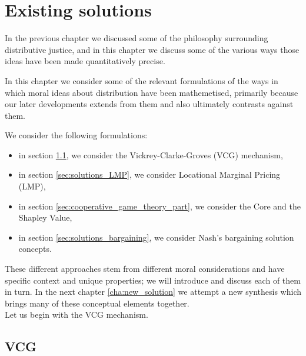 \chapter{Existing solutions}
\label{cha:solutions}

In the previous chapter we discussed some of the philosophy surrounding distributive justice, and in this chapter we discuss some of the various ways those ideas have been made quantitatively precise.

In this chapter we consider some of the relevant formulations of the ways in which moral ideas about distribution have been mathemetised, primarily because our later developments extends from them and also ultimately contrasts against them.

We consider the following formulations:
\begin{itemize}
\item in section \ref{sec:solutions_VCG}, we consider the Vickrey-Clarke-Groves (VCG) mechanism,
\item in section \ref{sec:solutions_LMP}, we consider Locational Marginal Pricing (LMP),
\item in section \ref{sec:cooperative_game_theory_part}, we consider the Core and the Shapley Value,
\item in section \ref{sec:solutions_bargaining}, we consider Nash's bargaining solution concepts.
\end{itemize}


These different approaches stem from different moral considerations and have specific context and unique properties; we will introduce and discuss each of them in turn.
In the next chapter \ref{cha:new_solution} we attempt a new synthesis which brings many of these conceptual elements together.\\
Let us begin with the VCG mechanism.

\section{VCG}\label{sec:solutions_VCG}

